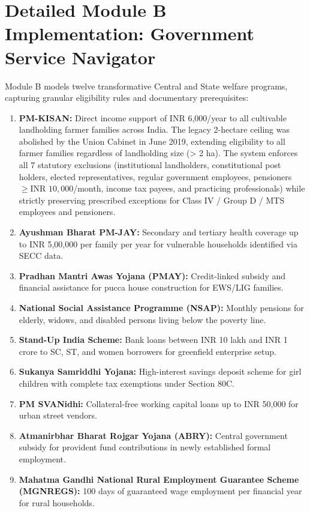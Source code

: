 \section{Detailed Module B Implementation: Government Service Navigator}
\label{sec:module_b_impl}
Module B models twelve transformative Central and State welfare programs, capturing granular eligibility rules and documentary prerequisites:
\begin{enumerate}
    \item \textbf{PM-KISAN:} Direct income support of INR 6,000/year to all cultivable landholding farmer families across India. The legacy 2-hectare ceiling was abolished by the Union Cabinet in June 2019, extending eligibility to all farmer families regardless of landholding size (> 2 ha). The system enforces all 7 statutory exclusions (institutional landholders, constitutional post holders, elected representatives, regular government employees, pensioners $\ge \text{INR } 10,000$/month, income tax payees, and practicing professionals) while strictly preserving prescribed exceptions for Class IV / Group D / MTS employees and pensioners.
    \item \textbf{Ayushman Bharat PM-JAY:} Secondary and tertiary health coverage up to INR 5,00,000 per family per year for vulnerable households identified via SECC data.
    \item \textbf{Pradhan Mantri Awas Yojana (PMAY):} Credit-linked subsidy and financial assistance for pucca house construction for EWS/LIG families.
    \item \textbf{National Social Assistance Programme (NSAP):} Monthly pensions for elderly, widows, and disabled persons living below the poverty line.
    \item \textbf{Stand-Up India Scheme:} Bank loans between INR 10 lakh and INR 1 crore to SC, ST, and women borrowers for greenfield enterprise setup.
    \item \textbf{Sukanya Samriddhi Yojana:} High-interest savings deposit scheme for girl children with complete tax exemptions under Section 80C.
    \item \textbf{PM SVANidhi:} Collateral-free working capital loans up to INR 50,000 for urban street vendors.
    \item \textbf{Atmanirbhar Bharat Rojgar Yojana (ABRY):} Central government subsidy for provident fund contributions in newly established formal employment.
    \item \textbf{Mahatma Gandhi National Rural Employment Guarantee Scheme (MGNREGS):} 100 days of guaranteed wage employment per financial year for rural households.

\end{enumerate}
